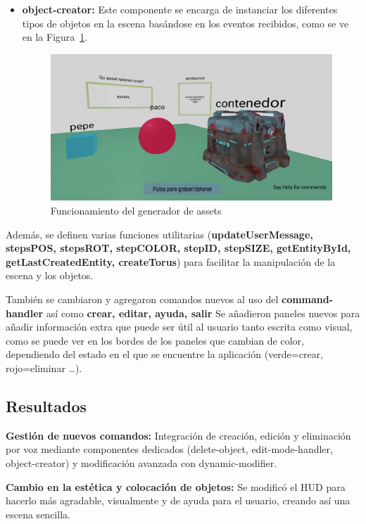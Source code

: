 \documentclass[a4paper, 12pt]{book}
\begin{document}
\begin{itemize}
  \item \textbf{object-creator:} Este componente se encarga de instanciar los diferentes tipos de objetos en la escena basándose en los eventos recibidos, como se ve en la Figura~\ref{fig:generadorassets}.
  \begin{figure}[H]  %
    \centering
    \includegraphics[width=0.6\linewidth]{img/generador_funcional_completo_assets.png}  %
    \caption{Funcionamiento del generador de assets}  %
    \label{fig:generadorassets}  %
  \end{figure} 
\end{itemize}

Además, se definen varias funciones utilitarias (\textbf{updateUserMessage, stepsPOS, stepsROT, stepCOLOR, stepID, stepSIZE, getEntityById, getLastCreatedEntity, createTorus}) para facilitar la manipulación de la escena y los objetos.

También se cambiaron y agregaron comandos nuevos al uso del \textbf{command-handler} así como \textbf{crear, editar, ayuda, salir}
Se añadieron paneles nuevos para añadir información extra que puede ser útil al usuario tanto escrita como visual, como se puede ver en los bordes de los paneles que cambian de color, dependiendo del estado en el que se encuentre la aplicación (verde=crear, rojo=eliminar \dots).
\subsection{Resultados}
\textbf{Gestión de nuevos comandos:} Integración de creación, edición y eliminación por voz mediante componentes dedicados (delete-object, edit-mode-handler, object-creator) y modificación avanzada con dynamic-modifier.

\textbf{Cambio en la estética y colocación de objetos:} Se modificó el HUD para hacerlo más agradable, visualmente y de ayuda para el usuario, creando así una escena sencilla.
\end{document}
